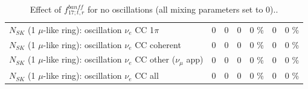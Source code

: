 \begin{table}
\begin{tabular}{| l | r | r | r  r | r  r |}
                     $N_{SK}$ (1 $\mu$-like ring): oscillation $\nu_e$ CC 1$\pi$ &               0 &               0 &               0 &        0 \%  &               0 &        0 \%  \\ 
                   $N_{SK}$ (1 $\mu$-like ring): oscillation $\nu_e$ CC coherent &               0 &               0 &               0 &        0 \%  &               0 &        0 \%  \\ 
      $N_{SK}$ (1 $\mu$-like ring): oscillation $\nu_e$ CC other ($\nu_\mu$ app) &               0 &               0 &               0 &        0 \%  &               0 &        0 \%  \\ 
                       $N_{SK}$ (1 $\mu$-like ring): oscillation $\nu_e$  CC all &               0 &               0 &               0 &        0 \%  &               0 &        0 \%  \\ 
\hline
\hline
\end{tabular}
\caption{ Effect of $f_{17; t, r}^{banff}$ for no oscillations (all mixing parameters set to 0).. }
\label{tab:num_banff_mares_1RmuT_3f_osc_t13:0}
\end{table}
\clearpage
